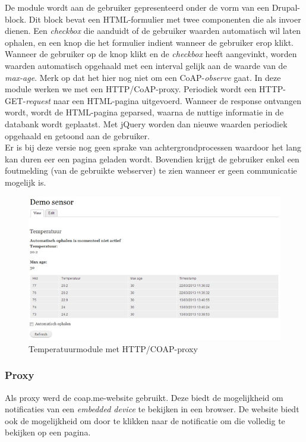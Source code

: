 De module wordt aan de gebruiker gepresenteerd onder de vorm van een Drupal-block. Dit block bevat een HTML-formulier met twee componenten die als invoer dienen. Een \textit{\textit{checkbox}} die aanduidt of de gebruiker waarden automatisch wil laten ophalen, en een knop die het formulier indient wanneer de gebruiker erop klikt.\\
Wanneer de gebruiker op de knop klikt en de \textit{\textit{checkbox}} heeft aangevinkt, worden waarden automatisch opgehaald met een interval gelijk aan de waarde van de \textit{max-age}. Merk op dat het hier nog niet om een CoAP-\textit{observe} gaat. In deze module werken we met een HTTP/CoAP-proxy. Periodiek wordt een HTTP-GET-\textit{request} naar een HTML-pagina uitgevoerd. Wanneer de response ontvangen wordt, wordt de HTML-pagina geparsed, waarna de nuttige informatie in de databank wordt geplaatst. Met jQuery worden dan nieuwe waarden periodiek opgehaald en getoond aan de gebruiker.\\

Er is bij deze versie nog geen sprake van achtergrondprocessen waardoor het lang kan duren eer een pagina geladen wordt. Bovendien krijgt de gebruiker enkel een foutmelding (van de gebruikte webserver) te zien wanneer er geen communicatie mogelijk is.

\begin{figure}[h!]
\vspace{10pt}
\includegraphics[width=1\textwidth]{fig/TemperatuurModuleHTTPCOAPProxy}
\vspace{-30pt}
\caption{Temperatuurmodule met HTTP/COAP-proxy}
\vspace{-10pt}
\end{figure}

\subsubsection{Proxy}
Als proxy werd de coap.me-website \cite{coapMe} gebruikt. Deze biedt de mogelijkheid om notificaties van een \textit{embedded device} te bekijken in een browser. De website biedt ook de mogelijkheid om door te klikken naar de notificatie om die volledig te bekijken op een pagina.\\


